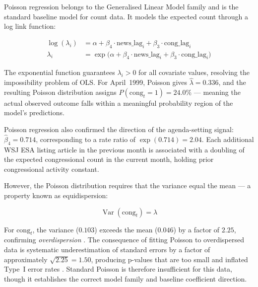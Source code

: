 \documentclass[11pt]{article}
\begin{document}
Poisson regression belongs to the Generalised Linear Model family
\citep{Nelder1972, McCullagh1989} and is the standard baseline model
for count data. It models the expected count through a log link
function:
 
\begin{align}
  \log(\lambda_i)
    &= \alpha + \beta_4 \cdot \text{news\_lag}_i
               + \beta_3 \cdot \text{cong\_lag}_i
  \label{eq:poisson_link} \\[3pt]
  \lambda_i
    &= \exp\!\bigl(
         \alpha + \beta_4 \cdot \text{news\_lag}_i
                + \beta_3 \cdot \text{cong\_lag}_i
       \bigr)
  \label{eq:poisson_mean}
\end{align}
 
The exponential function guarantees $\lambda_i > 0$ for all covariate
values, resolving the impossibility problem of OLS. For April~1999,
Poisson gives $\hat\lambda = 0.336$, and the resulting Poisson
distribution assigns $P(\text{cong}_{t} = 1) = 24.0\%$ --- meaning the
actual observed outcome falls within a meaningful probability region of
the model's predictions.
 
Poisson regression also confirmed the direction of the agenda-setting
signal: $\hat\beta_4 = 0.714$, corresponding to a rate ratio of
$\exp(0.714) = 2.04$. Each additional WSJ ESA listing article in the
previous month is associated with a doubling of the expected
congressional count in the current month, holding prior congressional
activity constant.
 
However, the Poisson distribution requires that the variance equal the
mean --- a property known as equidispersion:
 
\begin{equation}
  \operatorname{Var}(\text{cong}_{t}) = \lambda
  \label{eq:equidispersion}
\end{equation}
 
For $\text{cong}_{t}$, the variance ($0.103$) exceeds the mean
($0.046$) by a factor of $2.25$, confirming \textit{overdispersion}
\citep{Cameron1998, Hilbe2011}. The consequence of fitting Poisson to
overdispersed data is systematic underestimation of standard errors by a
factor of approximately $\sqrt{2.25} = 1.50$, producing p-values that
are too small and inflated Type~I error rates \citep{Ver-Hoef2007}.
Standard Poisson is therefore insufficient for this data, though it
establishes the correct model family and baseline coefficient direction.
 
\end{document}
